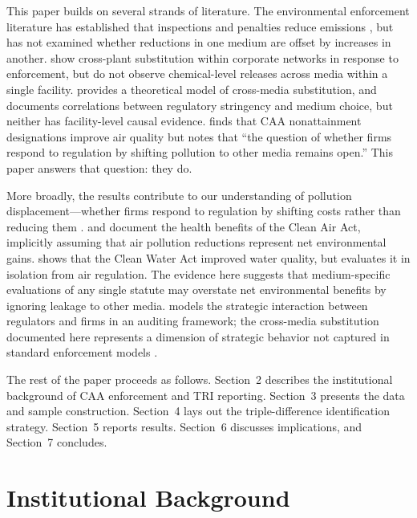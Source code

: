 \documentclass[12pt]{article}
\begin{document}
This paper builds on several strands of literature. The environmental enforcement literature has established that inspections and penalties reduce emissions \citep{gray2005compliance, shimshack2007enforce, shimshack2015enforcement, duflo2013truth, foulon2002incentives, deily1998beyond, gray2011effectiveness}, but has not examined whether reductions in one medium are offset by increases in another. \citet{rijal2020crossplant} show cross-plant substitution within corporate networks in response to enforcement, but do not observe chemical-level releases across media within a single facility. \citet{sigman1996crossmedia} provides a theoretical model of cross-media substitution, and \citet{sigman2001crossmedia} documents correlations between regulatory stringency and medium choice, but neither has facility-level causal evidence. \citet{greenstone2012does} finds that CAA nonattainment designations improve air quality but notes that ``the question of whether firms respond to regulation by shifting pollution to other media remains open.'' This paper answers that question: they do.

More broadly, the results contribute to our understanding of pollution displacement---whether firms respond to regulation by shifting costs rather than reducing them \citep{levinson2008pollution}. \citet{chay2003impact} and \citet{currie2020air} document the health benefits of the Clean Air Act, implicitly assuming that air pollution reductions represent net environmental gains. \citet{keiser2019consequences} shows that the Clean Water Act improved water quality, but evaluates it in isolation from air regulation. The evidence here suggests that medium-specific evaluations of any single statute may overstate net environmental benefits by ignoring leakage to other media. \citet{stafford2012auditing} models the strategic interaction between regulators and firms in an auditing framework; the cross-media substitution documented here represents a dimension of strategic behavior not captured in standard enforcement models \citep{harrington1988enforcement, becker1968crime}.

The rest of the paper proceeds as follows. Section~2 describes the institutional background of CAA enforcement and TRI reporting. Section~3 presents the data and sample construction. Section~4 lays out the triple-difference identification strategy. Section~5 reports results. Section~6 discusses implications, and Section~7 concludes.


\section{Institutional Background}
\end{document}
